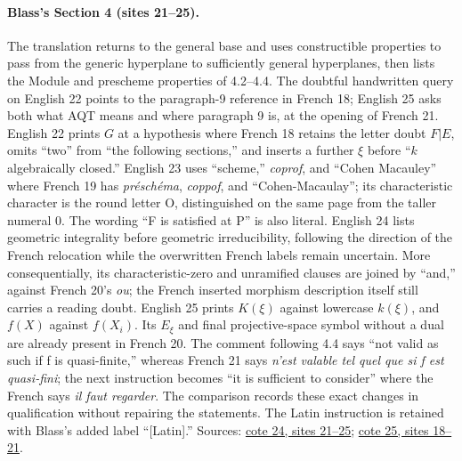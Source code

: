 \documentclass[10pt,a4paper]{article}
\begin{document}
\paragraph{Blass's Section 4 (sites 21--25).}
The translation returns to the general base and uses constructible properties to pass from the generic hyperplane to sufficiently general hyperplanes, then lists the Module and prescheme properties of 4.2--4.4. The doubtful handwritten query on English 22 points to the paragraph-9 reference in French 18; English 25 asks both what AQT means and where paragraph 9 is, at the opening of French 21. English 22 prints $G$ at a hypothesis where French 18 retains the letter doubt $F|E$, omits ``two'' from ``the following sections,'' and inserts a further $\xi$ before ``$k$ algebraically closed.'' English 23 uses ``scheme,'' \emph{coprof}, and ``Cohen Macauley'' where French 19 has \emph{préschéma}, \emph{coppof}, and ``Cohen-Macaulay''; its characteristic character is the round letter O, distinguished on the same page from the taller numeral 0. The wording ``F is satisfied at P'' is also literal. English 24 lists geometric integrality before geometric irreducibility, following the direction of the French relocation while the overwritten French labels remain uncertain. More consequentially, its characteristic-zero and unramified clauses are joined by ``and,'' against French 20's \emph{ou}; the French inserted morphism description itself still carries a reading doubt. English 25 prints $K(\xi)$ against lowercase $k(\xi)$, and $f(X)$ against $f(X_i)$. Its $E_\xi$ and final projective-space symbol without a dual are already present in French 20. The comment following 4.4 says ``not valid as such if f is quasi-finite,'' whereas French 21 says \emph{n'est valable tel quel que si f est quasi-fini}; the next instruction becomes ``it is sufficient to consider'' where the French says \emph{il faut regarder}. The comparison records these exact changes in qualification without repairing the statements. The Latin instruction is retained with Blass's added label ``[Latin].'' Sources: \href{https://grothendieck.umontpellier.fr/web/viewer.html?file=../24.pdf\#page=22}{cote 24, sites 21--25}; \href{https://grothendieck.umontpellier.fr/web/viewer.html?file=../25.pdf\#page=19}{cote 25, sites 18--21}.
\end{document}
